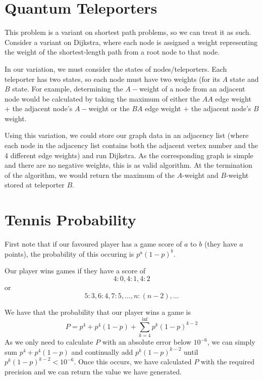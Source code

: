 \documentclass{article}
\begin{document}
\section{Quantum Teleporters}
This problem is a variant on shortest path problems, so we can treat it as such. Consider a variant on Dijkstra, where each node is assigned a weight representing the weight of the shortest-length path from a root node to that node.
\par 
In our variation, we must consider the states of nodes/teleporters. Each teleporter has two states, so each node must have two weights (for its $A$ state and $B$ state. For example, determining the $A-$weight of a node from an adjacent node would be calculated by taking the maximum of either the $AA$ edge weight + the adjacent node's $A-$weight or the $BA$ edge weight + the adjacent node's $B$ weight.
\par 
Using this variation, we could store our graph data in an adjacency list (where each node in the adjacency list contains both the adjacent vertex number and the 4 different edge weights) and run Dijkstra. As the corresponding graph is simple and there are no negative weights, this is as valid algorithm. At the termination of the algorithm, we would return the maximum of the $A$-weight and $B$-weight stored at teleporter $B$.


\section{Tennis Probability}
First note that if our favoured player has a game score of $a$ to $b$ (they have $a$ points), the probability of this occuring is $p^a(1-p)^b$.
\par 
Our player wins games if they have a score of 
\[4:0, 4:1,4:2\]
or 
\[5:3, 6:4,7:5,\dots, n:(n-2), \dots\]
\par 
We have that the probability that our player wins a game is 
\[P=p^4+p^4(1-p)+\sum^{\inf}_{k=4}{p^k(1-p)^{k-2}}\]
As we only need to calculate $P$ with an absolute error below $10^{-6}$, we can simply sum
$p^4+p^4(1-p)$ and continually add $p^k(1-p)^{k-2}$ until $p^k(1-p)^{k-2}<10^{-6}$. Once this occurs, we have calculated $P$ with the required precision and we can return the value we have generated.
\end{document}
